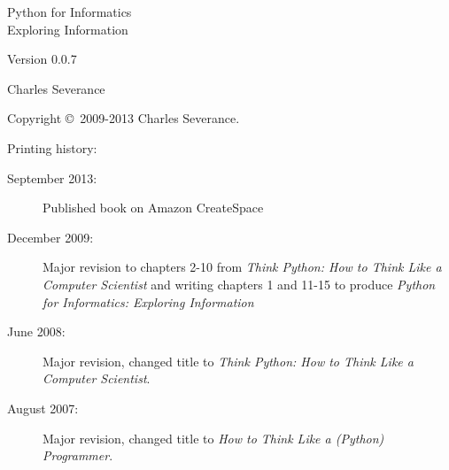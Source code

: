 \documentclass[11pt]{book}
\newcommand{\theversion}{0.0.7}
\begin{document}
\frontmatter




\newtheorem{ex}{Exercise}[chapter]

\begin{latexonly}

\renewcommand{\blankpage}{\thispagestyle{empty} \quad \newpage}

\thispagestyle{empty}

\begin{flushright}
\vspace*{2.0in}

\begin{spacing}{3}
{\huge Python for Informatics}\\
{\Large Exploring Information}
\end{spacing}

\vspace{0.25in}

Version \theversion

\vspace{0.5in}


{\Large
Charles Severance\\
}

\vfill

\end{flushright}

\pagebreak
\thispagestyle{empty}

{\small
Copyright \copyright ~2009-2013 Charles Severance.


Printing history:

\begin{description}

\item[September 2013:] Published book on Amazon CreateSpace

\item[December 2009:] Major revision to chapters 2-10 from
\emph{Think Python: How to Think Like
a Computer Scientist}
and writing chapters 1 and 11-15 to
produce 
\emph{Python for Informatics: Exploring Information}

\item[June 2008:] Major revision, changed title to
\emph{Think Python: How to Think Like
a Computer Scientist}.

\item[August 2007:] Major revision, changed title to
\emph{How to Think Like a (Python) Programmer}.


\end{description}}
\end{latexonly}
\end{document}

